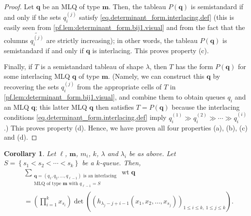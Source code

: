 \documentclass[reqno]{amsart}
\newcommand{\0}{\phantom{c}}
\let\sumnonlimits\sum
\let\prodnonlimits\prod
\renewcommand{\sum}{\sumnonlimits\limits}
\renewcommand{\prod}{\prodnonlimits\limits}
\theoremstyle{plain}
\newtheorem{cor}[thm]{Corollary}
\theoremstyle{definition}
\numberwithin{equation}{section}
\begin{document}
\begin{proof}
Let $\mathbf{q}$ be an MLQ of type $\mathbf{m}$. Then, the tableau $P\left(
\mathbf{q}\right)  $ is semistandard if and only if the sets $q_{i}^{\left(
j\right)  }$ satisfy \eqref{eq.determinant_form.interlacing.def} (this is
easily seen from \eqref{pf.lem:determinant_form.bij1.visual} and from the fact
that the columns $\widetilde{q_{i}^{\left(  j\right)  }}$ are strictly
increasing); in other words, the tableau $P\left(  \mathbf{q}\right)  $ is
semistandard if and only if $\mathbf{q}$ is interlacing. This proves property (c).

Finally, if $T$ is a semistandard tableau of shape $\lambda$, then $T$ has the
form $P\left(  \mathbf{q}\right)  $ for some interlacing MLQ $\mathbf{q}$ of
type $\mathbf{m}$. (Namely, we can construct this $\mathbf{q}$ by recovering
the sets $q_{i}^{\left(  j\right)  }$ from the appropriate cells of $T$ in
\eqref{pf.lem:determinant_form.bij1.visual}, and combine them to obtain queues
$q_{i}$ and an MLQ $\mathbf{q}$; this latter MLQ $\mathbf{q}$ then satisfies
$T=P\left(  \mathbf{q}\right)  $ because the interlacing conditions
\eqref{eq.determinant_form.interlacing.def} imply $q_{i}^{\left(  1\right)
}\gg q_{i}^{\left(  2\right)  }\gg\cdots\gg q_{i}^{\left(  i\right)  }$.) This
proves property (d). Hence, we have proven all four properties (a), (b), (c)
and (d).
\end{proof}

\begin{cor}
\label{cor:determinant_form.bij1c} Let $\ell$, $\mathbf{m}$, $m_{i}$, $k$,
$\lambda$ and $\lambda_{i}$ be as above. Let $S=\left\{  s_{1}<s_{2}%
<\cdots<s_{k}\right\}  $ be a $k$-queue. Then,%
\begin{align*}
&  \sum_{\substack{\mathbf{q}=\left(  q_{1},q_{2},\ldots,q_{\ell-1}\right)
\text{ is an interlacing}\\\text{MLQ of type }\mathbf{m}\text{ with }%
q_{\ell-1}=S}}\operatorname*{wt}\mathbf{q}\\
&  =\left(  \prod_{i=1}^{k}x_{s_{i}}\right)  \det\left(  \left(
h_{\lambda_{j}-j+i-1}\left(  x_{1},x_{2},\ldots,x_{s_{j}}\right)  \right)
_{1\leq i\leq k,\ 1\leq j\leq k}\right)  .
\end{align*}

\end{cor}
\end{document}
